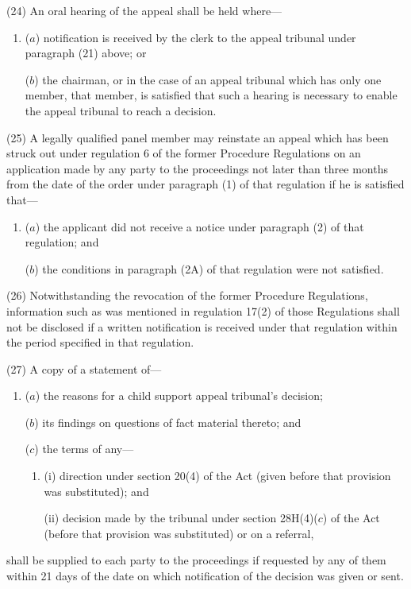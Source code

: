 \documentclass[12pt,a4paper]{article}
\begin{document}
(24) An oral hearing of the appeal shall be held where—
\begin{enumerate}\item[]
($a$) notification is received by the clerk to the appeal tribunal under paragraph (21) above; or

($b$) the chairman, or in the case of an appeal tribunal which has only one member, that member, is satisfied that such a hearing is necessary to enable the appeal tribunal to reach a decision.
\end{enumerate}

(25) A legally qualified panel member may reinstate an appeal which has been struck out under regulation 6 of the former Procedure Regulations on an application made by any party to the proceedings not later than three months from the date of the order under paragraph (1) of that regulation if he is satisfied that—
\begin{enumerate}\item[]
($a$) the applicant did not receive a notice under paragraph (2) of that regulation; and

($b$) the conditions in paragraph (2A) of that regulation were not satisfied.
\end{enumerate}

(26) Notwithstanding the revocation of the former Procedure Regulations, information such as was mentioned in regulation 17(2) of those Regulations shall not be disclosed if a written notification is received under that regulation within the period specified in that regulation.

(27) A copy of a statement of—
\begin{enumerate}\item[]
($a$) the reasons for a child support appeal tribunal’s decision;

($b$) its findings on questions of fact material thereto; and

($c$) the terms of any—
\begin{enumerate}\item[]
(i) direction under section 20(4) of the Act (given before that provision was substituted); and

(ii) decision made by the tribunal under section 28H(4)($c$) of the Act (before that provision was substituted) or on a referral,
\end{enumerate}
\end{enumerate}
shall be supplied to each party to the proceedings if requested by any of them within 21 days of the date on which notification of the decision was given or sent.
\end{document}
